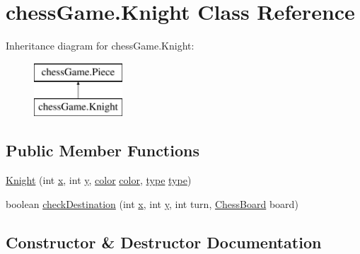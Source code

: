 \hypertarget{classchess_game_1_1_knight}{}\section{chess\+Game.\+Knight Class Reference}
\label{classchess_game_1_1_knight}
Inheritance diagram for chess\+Game.\+Knight\+:\begin{figure}[H]
\begin{center}
\leavevmode
\includegraphics[height=2.000000cm]{classchess_game_1_1_knight}
\end{center}
\end{figure}
\subsection*{Public Member Functions}
\begin{DoxyCompactItemize}
\item 
\hyperlink{classchess_game_1_1_knight_a037b6cf54ad40d6e529bc5f92fbca382}{Knight} (int \hyperlink{classchess_game_1_1_piece_aeb2d3374492005d799aa6b7b85be40e7}{x}, int \hyperlink{classchess_game_1_1_piece_a56e4d8d18eca3fd03a6bd5d6112d6359}{y}, \hyperlink{classchess_game_1_1_piece_ad5117cbbbaebf3a27c4f3c2bcbd6678b}{color} \hyperlink{classchess_game_1_1_piece_ad5117cbbbaebf3a27c4f3c2bcbd6678b}{color}, \hyperlink{classchess_game_1_1_piece_a1370c7f61581a1b72fa8ac2fd1af70a2}{type} \hyperlink{classchess_game_1_1_piece_a1370c7f61581a1b72fa8ac2fd1af70a2}{type})
\item 
boolean \hyperlink{classchess_game_1_1_knight_a30cf3ee38afa826f026d39ac83ef15d8}{check\+Destination} (int \hyperlink{classchess_game_1_1_piece_aeb2d3374492005d799aa6b7b85be40e7}{x}, int \hyperlink{classchess_game_1_1_piece_a56e4d8d18eca3fd03a6bd5d6112d6359}{y}, int turn, \hyperlink{classchess_game_1_1_chess_board}{Chess\+Board} board)
\end{DoxyCompactItemize}


\subsection{Constructor \& Destructor Documentation}
\hypertarget{classchess_game_1_1_knight_a037b6cf54ad40d6e529bc5f92fbca382}{}\label{classchess_game_1_1_knight_a037b6cf54ad40d6e529bc5f92fbca382} 
